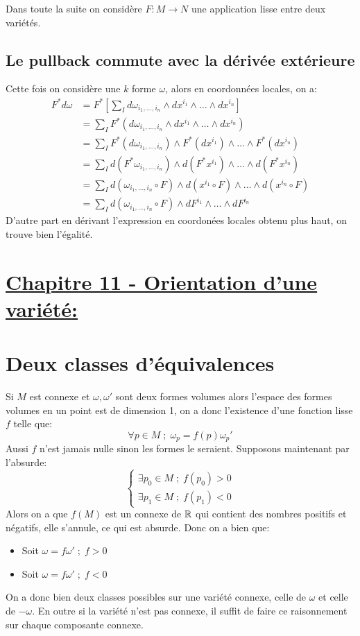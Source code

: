    Dans toute la suite on considère $F : M \longrightarrow N$ une application lisse entre deux variétés.
   \subsection*{Le pullback commute avec la dérivée extérieure}
      Cette fois on considère une $k$ forme $\omega$, alors en coordonnées locales, on a:
      \begin{align*}
         F^*d\omega &= F^*\left[\sum_{I} d\omega_{i_1, \ldots, i_n} \wedge dx^{i_1} \wedge \ldots \wedge dx^{i_n}\right]\\
         &= \sum_{I} F^*(d\omega_{i_1, \ldots, i_n} \wedge dx^{i_1}  \wedge \ldots \wedge dx^{i_n})\\
         &= \sum_{I} F^*(d\omega_{i_1, \ldots, i_n}) \wedge F^*(dx^{i_1})  \wedge \ldots \wedge F^*(dx^{i_n})\\
         &= \sum_{I} d(F^*\omega_{i_1, \ldots, i_n}) \wedge d(F^*x^{i_1})  \wedge \ldots \wedge d(F^*x^{i_n})\\
         &= \sum_{I} d(\omega_{i_1, \ldots, i_n} \circ F) \wedge d(x^{i_1} \circ F)  \wedge \ldots \wedge d(x^{i_n} \circ F)\\
         &= \sum_{I} d(\omega_{i_1, \ldots, i_n} \circ F) \wedge dF^{i_1}  \wedge \ldots \wedge  dF^{i_n}
      \end{align*}
      D'autre part en dérivant l'expression en coordonées locales obtenu plus haut, on trouve bien l'égalité.

\pagebreak
\section*{\uline{Chapitre 11 - Orientation d'une variété{:}}}
   \section{Deux classes d'équivalences}
      Si \( M \) est connexe et \( \omega, \omega' \) sont deux formes volumes alors l'espace des formes volumes en un point est de dimension 1, on a donc l'existence d'une fonction lisse \( f \) telle que:
      \[ 
         \forall p \in M \; ; \; \omega_p = f(p) \omega_p' 
      \]
      Aussi \( f \) n'est jamais nulle sinon les formes le seraient. Supposons maintenant par l'absurde:
      \[ 
         \begin{cases}
            \exists p_0 \in M \; ; \; f(p_0) > 0\\
            \exists p_1 \in M \; ; \; f(p_1) < 0
         \end{cases} 
      \]
      Alors on a que \(f(M)\) est un connexe de \( \mathbb{R} \) qui contient des nombres positifs et négatifs, elle s'annule, ce qui est absurde. Donc on a bien que:
      \begin{itemize}
         \item Soit \( \omega = f \omega' \; ; \; f > 0 \)
         \item Soit \( \omega = f\omega' \; ; \; f < 0 \) 
      \end{itemize}
      On a donc bien deux classes possibles sur une variété connexe, celle de \( \omega \) et celle de \( -\omega \). En outre si la variété n'est pas connexe, il suffit de faire ce raisonnement sur chaque composante connexe.
